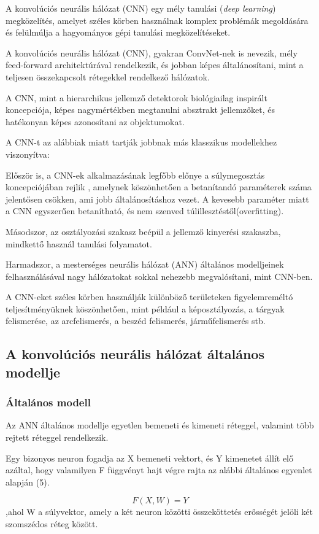 \documentclass[12pt,a4]{article}
\begin{document}
	A konvolúciós neurális hálózat (CNN) \cite{CNN} egy
	mély tanulási (\textit{deep learning}) megközelítés, amelyet széles körben használnak komplex problémák megoldására és felülmúlja a hagyományos gépi
	tanulási megközelítéseket.
	
	A konvolúciós neurális hálózat (CNN), gyakran ConvNet-nek is nevezik, mély feed-forward architektúrával rendelkezik, és jobban képes általánosítani, mint a teljesen összekapcsolt rétegekkel rendelkező hálózatok.
	
	A CNN, mint a hierarchikus jellemző detektorok biológiailag inspirált koncepciója, képes nagymértékben megtanulni
	absztrakt jellemzőket, és hatékonyan képes azonosítani az objektumokat.
	
	A CNN-t az alábbiak miatt tartják jobbnak más klasszikus modellekhez viszonyítva:
	
	Először is, a CNN-ek alkalmazásának legfőbb előnye a súlymegosztás koncepciójában rejlik
	, amelynek köszönhetően a betanítandó paraméterek száma jelentősen csökken, ami  jobb általánosításhoz vezet. 
	A kevesebb paraméter miatt a CNN egyszerűen betanítható, és nem szenved túlillesztéstől(overfitting).
	
	
	Másodszor, az osztályozási szakasz beépül a jellemző kinyerési szakaszba, mindkettő használ tanulási folyamatot.
	
	
	Harmadszor, a mesterséges neurális hálózat (ANN) általános modelljeinek felhasználásával nagy hálózatokat sokkal nehezebb megvalósítani,
	mint CNN-ben.
	
	
	A CNN-eket széles körben használják különböző területeken figyelemreméltó
	teljesítményüknek köszönhetően, mint például a képosztályozás, a tárgyak felismerése, az arcfelismerés, a beszéd
	felismerés, járműfelismerés stb.
	
	\subsection{A konvolúciós neurális hálózat általános modellje}
	
	\subsubsection{Általános modell}
	Az ANN általános modellje \cite{CNN} egyetlen bemeneti és kimeneti réteggel,
	valamint több rejtett réteggel rendelkezik.
	
	Egy bizonyos 
	neuron fogadja az X bemeneti vektort, és Y kimenetet állít elő azáltal,
	hogy valamilyen F függvényt hajt végre rajta az alábbi általános egyenlet alapján (5).
	\begin{mdframed}
	\begin{equation}
			F(X, W) = Y
	\end{equation}
	,ahol W a súlyvektor, amely a két neuron közötti összeköttetés erősségét jelöli két szomszédos réteg között.
 	\end{mdframed}
\end{document}
